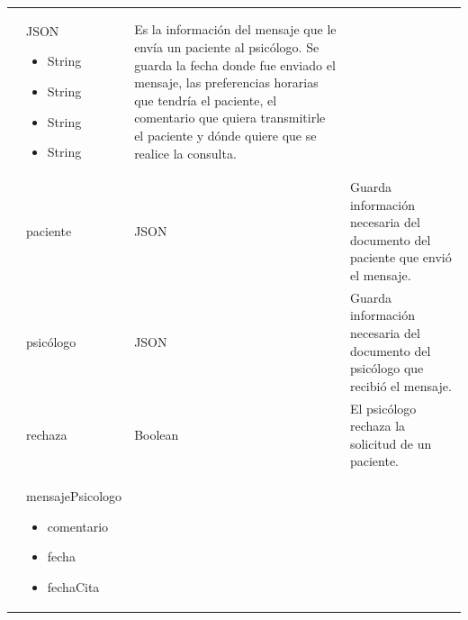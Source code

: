 \begin{table}[htpb]
\begin{tabularx}{\textwidth}{|l|X|X|X|}
\begin{itemize}
                                    \end{itemize} & JSON \begin{itemize}
                                    \item String
                                    \item String
                                    \item String
                                    \item String
                                    \end{itemize} & Es la información del mensaje que le envía un paciente al psicólogo. Se guarda la fecha donde fue enviado el mensaje, las preferencias horarias que tendría el paciente, el comentario que quiera transmitirle el paciente y dónde quiere que se realice la consulta. \\ \cline{2-4} 
                                    & paciente                                              & JSON                                     & Guarda información necesaria del documento del paciente que envió el mensaje.                                                                                                                                                                                         \\ \cline{2-4} 
                                    & psicólogo                                             & JSON                                     & Guarda información necesaria del documento del psicólogo que recibió el mensaje.                                                                                                                                                                                      \\ \cline{2-4} 
                                    & rechaza                                               & Boolean                                  & El psicólogo rechaza la solicitud de un paciente.                                                                                                                                                                                                                     \\ \cline{2-4} 
                                    & mensajePsicologo \begin{itemize}
                                    \item comentario
                                    \item fecha
                                    \item fechaCita

\end{itemize}
\end{tabularx}
\end{table}
